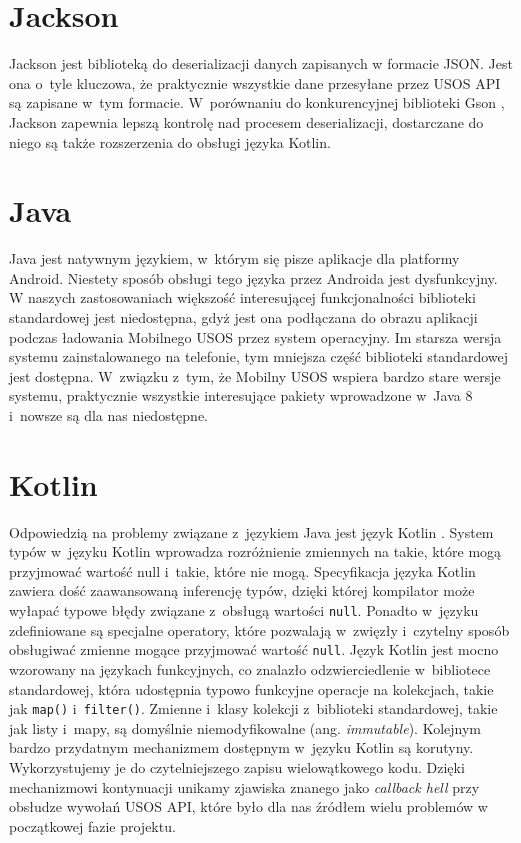\documentclass{pracamgr}
\begin{document}
\section{Jackson}

Jackson \cite{jackson} jest biblioteką do deserializacji danych zapisanych w
formacie JSON. Jest ona o~tyle kluczowa, że praktycznie wszystkie dane przesyłane
przez USOS API są zapisane w~tym formacie. W~porównaniu do konkurencyjnej biblioteki
Gson \cite{gson}, Jackson zapewnia lepszą kontrolę nad procesem deserializacji,
dostarczane do niego są także rozszerzenia do obsługi języka Kotlin.

\section{Java}

Java \cite{java} jest natywnym językiem, w~którym się pisze aplikacje dla platformy
Android. Niestety sposób obsługi tego języka przez Androida jest dysfunkcyjny.
W naszych zastosowaniach większość interesującej funkcjonalności biblioteki
standardowej jest niedostępna, gdyż jest ona podłączana do obrazu aplikacji podczas
ładowania Mobilnego USOS przez system operacyjny. Im starsza wersja systemu
zainstalowanego na telefonie, tym mniejsza część biblioteki standardowej jest
dostępna. W~związku z~tym, że Mobilny USOS wspiera bardzo stare wersje systemu,
praktycznie wszystkie interesujące pakiety wprowadzone w~Java 8 i~nowsze są dla
nas niedostępne.

\section{Kotlin}

Odpowiedzią na problemy związane z~językiem Java jest język Kotlin \cite{kotlin}.
System typów w~języku Kotlin wprowadza rozróżnienie zmiennych na takie, które mogą
przyjmować wartość null i~takie, które nie mogą. Specyfikacja języka Kotlin zawiera
dość zaawansowaną inferencję typów, dzięki której kompilator może wyłapać typowe błędy
związane z~obsługą wartości \texttt{null}. Ponadto w~języku zdefiniowane są specjalne
operatory, które pozwalają w~zwięzły i~czytelny sposób obsługiwać zmienne mogące
przyjmować wartość \texttt{null}. Język Kotlin jest mocno wzorowany na językach funkcyjnych,
co znalazło odzwierciedlenie w~bibliotece standardowej, która udostępnia typowo
funkcyjne operacje na kolekcjach, takie jak \texttt{map()} i~\texttt{filter()}. Zmienne i~klasy
kolekcji z~biblioteki standardowej, takie jak listy i~mapy, są domyślnie niemodyfikowalne
(ang. \textit{immutable}). Kolejnym bardzo przydatnym mechanizmem dostępnym w~języku
Kotlin są korutyny. Wykorzystujemy je do czytelniejszego zapisu wielowątkowego
kodu. Dzięki mechanizmowi kontynuacji unikamy zjawiska znanego jako \textit{callback hell}
przy obsłudze wywołań USOS API, które było dla nas źródłem wielu problemów w
początkowej fazie projektu.
\end{document}
